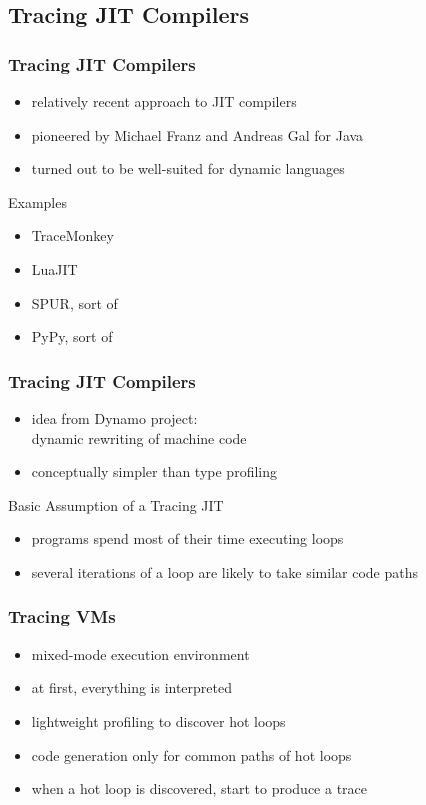 \documentclass[utf8x]{beamer}
\begin{document}
\subsection{Tracing JIT Compilers}

\begin{frame}
  \frametitle{Tracing JIT Compilers}
  \begin{itemize}
      \item relatively recent approach to JIT compilers
      \item pioneered by Michael Franz and Andreas Gal for Java
      \item turned out to be well-suited for dynamic languages
  \end{itemize}
  \pause
  \begin{block}{Examples}
      \begin{itemize}
          \item \alert{TraceMonkey}
          \item \alert{LuaJIT}
          \item \alert{SPUR}, sort of
          \item \alert{PyPy}, sort of
      \end{itemize}
  \end{block}
\end{frame}

\begin{frame}
    \frametitle{Tracing JIT Compilers}
    \begin{itemize}
    \item idea from Dynamo project: \\
    dynamic rewriting of machine code
    \item conceptually simpler than type profiling
    \end{itemize}
    \pause
    \begin{block}{Basic Assumption of a Tracing JIT}
        \begin{itemize}
        \item programs spend most of their time executing loops
        \item several iterations of a loop are likely to take similar code paths
        \end{itemize}
    \end{block}
\end{frame}

\begin{frame}
    \frametitle{Tracing VMs}
    \begin{itemize}
    \item mixed-mode execution environment
    \item at first, everything is interpreted
    \item lightweight profiling to discover hot loops
    \item code generation only for common paths of hot loops
    \item when a hot loop is discovered, start to produce a trace
    \end{itemize}
\end{frame}
\end{document}
